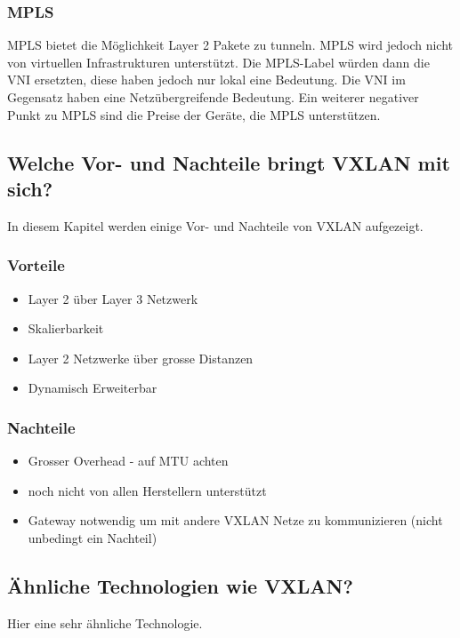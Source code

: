 \documentclass[a4,12pt]{scrartcl}
\begin{document}
\subsubsection{MPLS}
MPLS bietet die Möglichkeit Layer 2 Pakete zu tunneln. MPLS wird jedoch nicht von virtuellen Infrastrukturen unterstützt. Die MPLS-Label würden dann die VNI ersetzten, diese haben jedoch nur lokal eine Bedeutung. Die VNI im Gegensatz haben eine Netzübergreifende Bedeutung. Ein weiterer negativer Punkt zu MPLS sind die Preise der Geräte, die MPLS unterstützen. 
\newpage

\subsection{Welche Vor- und Nachteile bringt VXLAN mit sich?}
In diesem Kapitel werden einige Vor- und Nachteile von VXLAN aufgezeigt. 

\subsubsection{Vorteile}
\begin{itemize}
\item Layer 2 über Layer 3 Netzwerk 
\item Skalierbarkeit 
\item Layer 2 Netzwerke über grosse Distanzen
\item Dynamisch Erweiterbar 
\end{itemize}

\subsubsection{Nachteile}
\begin{itemize}
\item Grosser Overhead - auf MTU achten 
\item noch nicht von allen Herstellern unterstützt
\item Gateway notwendig um mit andere VXLAN Netze zu kommunizieren (nicht unbedingt ein Nachteil) 
\end{itemize}

\subsection{Ähnliche Technologien wie VXLAN?}
Hier eine sehr ähnliche Technologie. 
\end{document}
